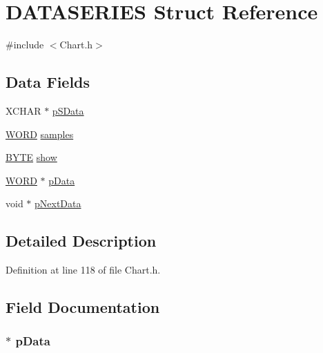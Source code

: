\hypertarget{struct_d_a_t_a_s_e_r_i_e_s}{}\section{D\+A\+T\+A\+S\+E\+R\+I\+E\+S Struct Reference}
\label{struct_d_a_t_a_s_e_r_i_e_s}


{\ttfamily \#include $<$Chart.\+h$>$}

\subsection*{Data Fields}
\begin{DoxyCompactItemize}
\item 
X\+C\+H\+A\+R $\ast$ \hyperlink{struct_d_a_t_a_s_e_r_i_e_s_a2a5ec35e3a98031d8114e25ef37383b5}{p\+S\+Data}
\item 
\hyperlink{_generic_type_defs_8h_a2b0e863dadf920709ec53d9088ee7c91}{W\+O\+R\+D} \hyperlink{struct_d_a_t_a_s_e_r_i_e_s_a70276314030d97259ec95114d4d1606d}{samples}
\item 
\hyperlink{_generic_type_defs_8h_a4ae1dab0fb4b072a66584546209e7d58}{B\+Y\+T\+E} \hyperlink{struct_d_a_t_a_s_e_r_i_e_s_a11677dbf3ed4ae5e64818bde6496f0a3}{show}
\item 
\hyperlink{_generic_type_defs_8h_a2b0e863dadf920709ec53d9088ee7c91}{W\+O\+R\+D} $\ast$ \hyperlink{struct_d_a_t_a_s_e_r_i_e_s_a1aec7e401d51c951c5d6ac69f69f7326}{p\+Data}
\item 
void $\ast$ \hyperlink{struct_d_a_t_a_s_e_r_i_e_s_ad68e87fe62f00e55bf74a5f7ae784719}{p\+Next\+Data}
\end{DoxyCompactItemize}


\subsection{Detailed Description}


Definition at line 118 of file Chart.\+h.



\subsection{Field Documentation}
\hypertarget{struct_d_a_t_a_s_e_r_i_e_s_a1aec7e401d51c951c5d6ac69f69f7326}{}
\subsubsection[{p\+Data}]{$\ast$ p\+Data}\label{struct_d_a_t_a_s_e_r_i_e_s_a1aec7e401d51c951c5d6ac69f69f7326}


